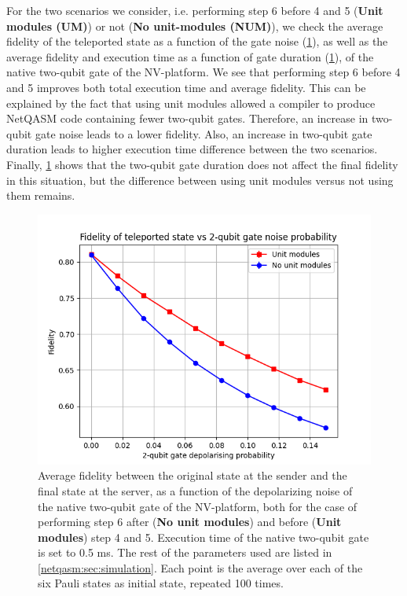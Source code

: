 For the two scenarios we consider, i.e. performing step 6 before 4 and 5 (\textbf{Unit modules (UM)}) or not (\textbf{No unit-modules (NUM)}), we check the average fidelity of the teleported state as a function of the gate noise (\cref{netqasm:fig:sweep_gate_noise}), as well as the average fidelity and execution time as a function of gate duration (\cref{netqasm:fig:sweep_gate_noise}), of the native two-qubit gate of the NV-platform. We see that performing step 6 before 4 and 5 improves both total execution time and average fidelity.
This can be explained by the fact that using unit modules allowed a compiler to produce \ac{NetQASM} code containing fewer two-qubit gates.
Therefore, an increase in two-qubit gate noise leads to a lower fidelity.
Also, an increase in two-qubit gate duration leads to higher execution time difference between the two scenarios.
Finally, \cref{netqasm:fig:sweep_gate_noise} shows that the two-qubit gate duration does not affect the final fidelity in this situation, but the difference between using unit modules versus not using them remains.


\begin{figure}[t]
    \centering
    \includegraphics[scale=0.8]{figures/netqasm/plots/paper_teleport_sweep_gate_noise.png}
    \caption{
        Average fidelity between the original state at the sender and
        the final state at the server, as a function of the depolarizing noise
        of the native two-qubit gate of the NV-platform, both for the case of
        performing step 6 after (\textbf{No unit modules}) and before
        (\textbf{Unit modules}) step 4 and 5. Execution time of the native
        two-qubit gate is set to 0.5 ms. The rest of the parameters used are
        listed in \cref{netqasm:sec:simulation}. Each point is the average over each of
        the six Pauli states as initial state, repeated 100 times.}
    \label{netqasm:fig:sweep_gate_noise}
\end{figure}

